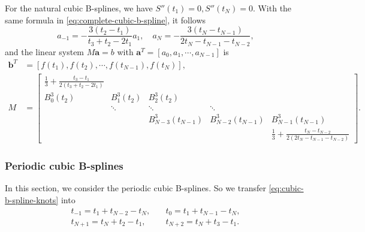 \documentclass[a4paper]{article}
\theoremstyle{definition}
\begin{document}
For the natural cubic B-splines, we have $S''(t_1) = 0, S''(t_N) = 0$. With the same formula in \cref{eq:complete-cubic-b-spline}, it follows 
\begin{equation}
  a_{-1} = -\frac{3(t_2 - t_1)}{t_3 + t_2 - 2t_1} a_1,\quad a_N = -\frac{3(t_N - t_{N - 1})}{2t_N - t_{N - 1} - t_{N - 2}},
  \label{eq:natural-cubic-b-spline-coefficients}
\end{equation}
and the linear system $M\mathbf{a} = b$ with $\mathbf{a}^T = [a_0, a_1, \cdots, a_{N - 1}]$ is 
\begin{equation}
  \begin{aligned}
    \mathbf{b}^T &= [f(t_1), f(t_2), \cdots, f(t_{N - 1}), f(t_N)], \\
    M &= \begin{bmatrix}
      \frac{1}{3} + \frac{t_3 - t_1}{2(t_3 + t_2 - 2t_1)} &    &    &    &    \\
      B_0^3(t_2) & B_1^3(t_2) & B_2^3(t_2) &    &    \\
        & \ddots & \ddots & \ddots &    \\
        &    & B_{N - 3}^3(t_{N - 1}) & B_{N - 2}^3(t_{N - 1}) & B_{N - 1}^3(t_{N - 1}) \\
        &    &    &    & \frac{1}{3} + \frac{t_N - t_{N - 2}}{2(2t_N - t_{N - 1} - t_{N - 2})}
    \end{bmatrix}.
  \end{aligned}
  \label{eq:natural-cubic-b-spline-linear-system}
\end{equation}

\subsubsection{Periodic cubic B-splines}

In this section, we consider the periodic cubic B-splines. So we transfer \cref{eq:cubic-b-spline-knots} into 
\begin{equation}
  \begin{aligned}
    t_{-1} = t_1 + t_{N - 2} - t_N,\quad & t_0 = t_1 + t_{N - 1} - t_N, \\
    t_{N + 1} = t_N + t_2 - t_1,\quad & t_{N + 2} = t_N + t_3 - t_1.
  \end{aligned}
  \label{eq:periodic-cubic-b-spline-knots}
\end{equation}
\end{document}
